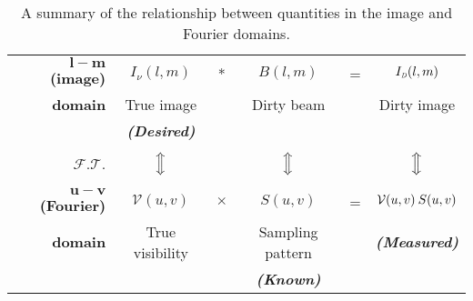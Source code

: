\begin{table}
  \centering
  \begin{tabular}{r|ccccc}
$\mathbf{l-m}$ \textbf{(image)}     & $I_\nu (l, m)$            & * & $B(l, m)$               & = & $I_{\mbox{\tiny{\emph{D}}}}(l, m)$ \\
\textbf{domain}                     & True image               & & Dirty beam              &   & Dirty image                       \\
                                    & \emph{\textbf{(Desired)}}& & & & \\
                                    &                          & & & & \\
              $\mathcal{F.T.}$      & $\Big \Updownarrow $     & & $\Big \Updownarrow $    &   & $\Big \Updownarrow $              \\
                                    &                          & & & & \\
$\mathbf{u-v}$ \textbf{(Fourier)}   & $\mathcal{V}(u,  v)$     & $\times $ & $S(u, v)$               & = & $\mathcal{V}(u,  v) \msp S(u, v)$ \\
      \textbf{domain}               & True visibility          & & Sampling pattern        &   & \emph{\textbf{(Measured)}}        \\
                                    &                          & & \emph{\textbf{(Known)}} &   &                                   \\
  \end{tabular}
  \caption[]{A summary of the relationship between quantities in the image and Fourier domains.}
  \label{tab:uv-summary}
\end{table}

